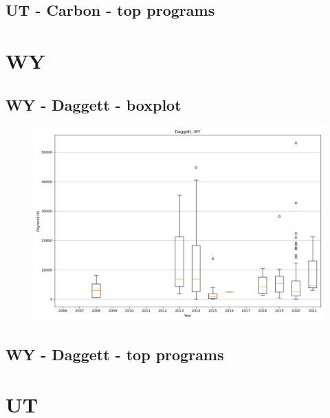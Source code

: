 \subsection*{UT - Carbon - top programs}

\newpage
\section*{WY}
\subsection*{WY - Daggett - boxplot}
\begin{figure}[h]
\centering
\includegraphics[width=7in]{../output/boxplots/counties/Daggett-WY_boxplot.png}
\end{figure}


\subsection*{WY - Daggett - top programs}

\newpage
\section*{UT}
